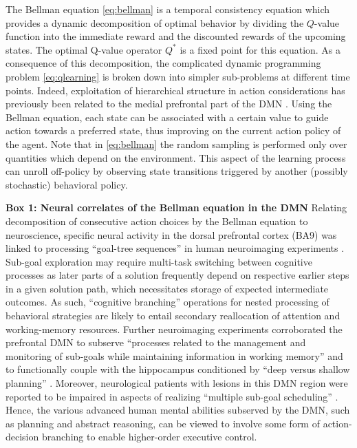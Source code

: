 \documentclass[10pt,letterpaper]{article}
\begin{document}
The Bellman equation \eqref{eq:bellman} is a temporal consistency equation which provides
a dynamic decomposition of optimal behavior by dividing the $Q$-value function into the immediate
reward and the discounted rewards of the upcoming states.
The optimal Q-value operator $Q^*$ is a fixed point for this equation.
As a consequence of this decomposition, the complicated dynamic programming
problem \eqref{eq:qlearning}
is broken down into simpler sub-problems at different time points.
Indeed,
exploitation of hierarchical structure in action considerations
has previously been related to the medial prefrontal part of the DMN
\citep{koechlin1999role, braver2002role}.
Using the Bellman equation, each state can be associated with a certain value
to guide action towards a preferred state, thus improving on the
current action policy of the agent.
Note that in \eqref{eq:bellman} the random sampling
is performed only over quantities which
depend on the environment.
This aspect of the learning process
can unroll off-policy by observing state transitions
triggered by another (possibly stochastic) behavioral policy.

\begin{mdframed}
  \vspace{2em}
  \textbf{Box 1: Neural correlates of the Bellman equation in the DMN}
Relating decomposition of consecutive action choices by the Bellman equation
to neuroscience,
specific neural activity in the dorsal prefrontal cortex (BA9)
was linked to processing ``goal-tree sequences''
in human neuroimaging experiments
\citep{koechlin1999role, koechlin2000dissociating}.
Sub-goal exploration may require multi-task switching
between cognitive processes
as later parts of a solution
frequently depend on respective earlier steps in a given solution path, which
necessitates storage of expected intermediate outcomes.
As such,
``cognitive branching'' operations for nested processing of behavioral strategies
are likely to
entail secondary reallocation of attention and working-memory resources.
Further neuroimaging experiments corroborated
the prefrontal DMN to subserve
``processes related to the management and monitoring of sub-goals while
maintaining information in working memory''
\citep{braver2002role}
and to functionally couple with the hippocampus conditioned by ``deep versus shallow planning''
\citep{kaplan2017neural}.
%
Moreover,
neurological patients with lesions in this DMN region were reported
to be impaired in aspects of realizing ``multiple sub-goal scheduling''
\citep{burgess2000cognitive}.
Hence,
the various advanced human mental abilities subserved by the DMN, such as
planning and abstract reasoning, can be viewed to involve some form of
action-decision branching to enable higher-order executive control.
\end{mdframed}
\end{document}
